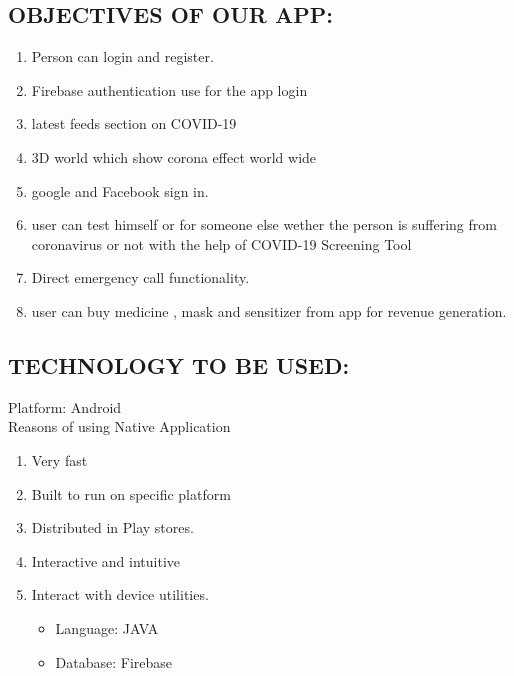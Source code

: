\subsection{OBJECTIVES OF OUR APP:}
\begin{enumerate}
    \item Person can login and register.
    \item Firebase authentication use for the app login
    \item latest feeds section on COVID-19
    \item 3D world which show corona effect world wide
    \item google and Facebook sign in.
    \item user can test himself or for someone else wether the person is suffering from coronavirus or not with the help of COVID-19 Screening Tool
    \item Direct emergency call functionality.
    \item user can buy medicine , mask and sensitizer from app for revenue generation.
\end{enumerate}
\subsection{TECHNOLOGY TO BE USED:}
Platform: Android\\
Reasons of using Native Application
\begin{enumerate}
\item Very fast
\item Built to run on specific platform
\item Distributed in Play stores.
\item Interactive and intuitive
\item Interact with device utilities.
\begin{itemize}
    \item Language: JAVA
    \item Database: Firebase 
\end{itemize}
\end{enumerate}
